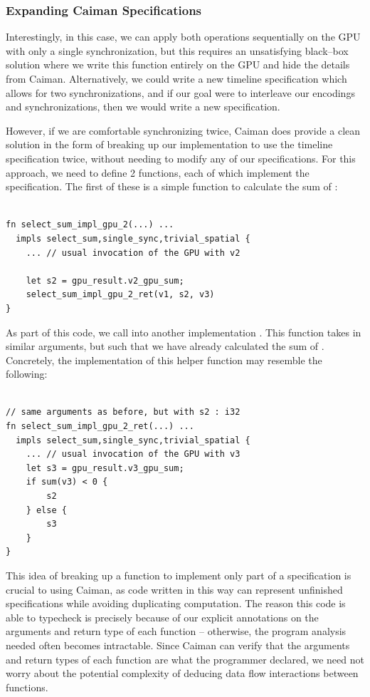 \subsubsection{Expanding Caiman Specifications}
\label{subsec:caimanexpanding}

Interestingly, in this case, we can apply both operations sequentially on the GPU with only a single synchronization, but this requires an unsatisfying black--box solution where we write this function entirely on the GPU and hide the details from Caiman.  Alternatively, we could write a new timeline specification which allows for two synchronizations, and if our goal were to interleave our encodings and synchronizations, then we would write a new specification.

However, if we are comfortable synchronizing twice, Caiman does provide a clean solution in the form of breaking up our implementation to use the timeline specification twice, without needing to modify any of our specifications.  For this approach, we need to define 2 functions, each of which implement the  specification.  The first of these is a simple function to calculate the sum of :
%
\begin{lstlisting}

fn select_sum_impl_gpu_2(...) ...
  impls select_sum,single_sync,trivial_spatial {
    ... // usual invocation of the GPU with v2
    
    let s2 = gpu_result.v2_gpu_sum;
    select_sum_impl_gpu_2_ret(v1, s2, v3)
}
\end{lstlisting}
%
As part of this code, we call into another implementation .  This function takes in similar arguments, but such that we have already calculated the sum of .  Concretely, the implementation of this helper function may resemble the following:
%
\begin{lstlisting}

// same arguments as before, but with s2 : i32
fn select_sum_impl_gpu_2_ret(...) ...
  impls select_sum,single_sync,trivial_spatial {
	... // usual invocation of the GPU with v3
	let s3 = gpu_result.v3_gpu_sum;
	if sum(v3) < 0 {
		s2
	} else {
		s3
	}
}
\end{lstlisting}
%
This idea of breaking up a function to implement only part of a specification is crucial to using Caiman, as code written in this way can represent unfinished specifications while avoiding duplicating computation.  The reason this code is able to typecheck is precisely because of our explicit annotations on the arguments and return type of each function -- otherwise, the program analysis needed often becomes intractable.  Since Caiman can verify that the arguments and return types of each function are what the programmer declared, we need not worry about the potential complexity of deducing data flow interactions between functions.

